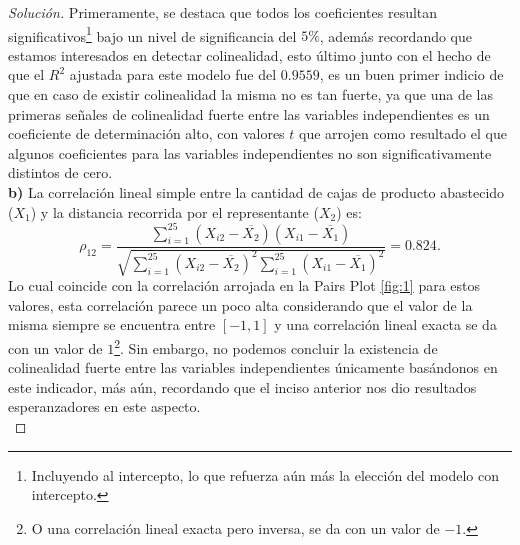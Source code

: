 \documentclass[10.5pt,notitlepage]{article}
\newenvironment{solucion}
  {\begin{proof}[Solución]}
  {\end{proof}}
\theoremstyle{plain}
\begin{document}
\begin{solucion}
Primeramente, se destaca que todos los coeficientes resultan significativos\footnote{Incluyendo al intercepto, lo que refuerza aún más la elección del modelo con intercepto.} bajo un nivel de significancia del \(5\%\), además recordando que estamos interesados en detectar colinealidad, esto último junto con el hecho de que el \(R^2\) ajustada para este modelo fue del \(0.9559\), es un buen primer indicio de que en caso de existir colinealidad la misma no es tan fuerte, ya que una de las primeras señales de colinealidad fuerte entre las variables independientes es un coeficiente de determinación alto, con valores \(t\) que arrojen como resultado el que algunos coeficientes para las variables independientes no son significativamente distintos de cero. \\ 

\noindent \textbf{b) } La correlación lineal simple entre la cantidad de cajas de producto abastecido ($X_1$) y la distancia recorrida por el representante ($X_2$) es:
\begin{equation}\label{1.5}
    \rho_{12} = \frac{\sum_{i=1}^{25}(X_{i2} - \overline{X_2})(X_{i1} - \overline{X_1})}{\sqrt{\sum_{i=1}^{25}(X_{i2} - \overline{X_2})^2\sum_{i=1}^{25}(X_{i1} - \overline{X_1})^2}} = 0.824. 
\end{equation}
Lo cual coincide con la correlación arrojada en la Pairs Plot \eqref{fig:1} para estos valores, esta correlación parece un poco alta considerando que el valor de la misma siempre se encuentra entre \([-1,1]\) y una correlación lineal exacta se da con un valor de \(1\)\footnote{O una correlación lineal exacta pero inversa, se da con un valor de \(-1\).}. Sin embargo, no podemos concluir la existencia de colinealidad fuerte entre las variables independientes únicamente basándonos en este indicador, más aún, recordando que el inciso anterior nos dio resultados esperanzadores en este aspecto. \\ 


\end{solucion}
\end{document}
